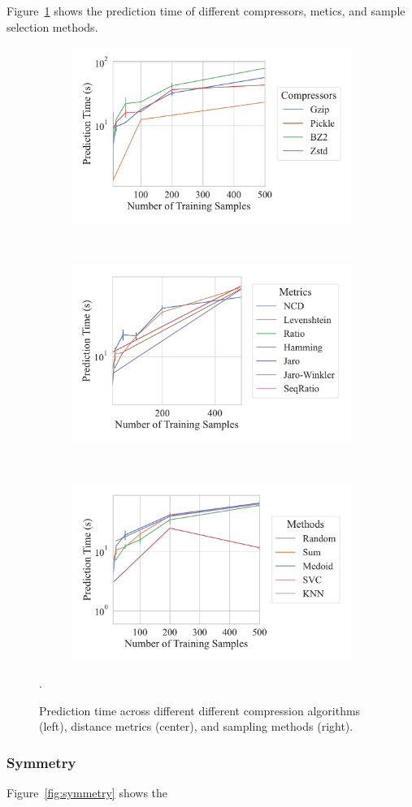 \documentclass[sigconf]{acmart}
\begin{document}
Figure~\ref{fig:prediction_time} shows the prediction time of different compressors, metics, and sample selection methods.
\begin{figure}
	\begin{subfigure}
		\centering
		\includegraphics[width=.32\textwidth]{figs/truthseeker/compressor_vs_predict_time.pdf}
	\end{subfigure}%
	~
	\begin{subfigure}
		\centering
		\includegraphics[width=.32\textwidth]{figs/truthseeker/metric_vs_predict_time.pdf}
	\end{subfigure}
	~
	\begin{subfigure}
		\centering
		\includegraphics[width=.32\textwidth]{figs/truthseeker/method_vs_predict_time.pdf}
	\end{subfigure}
	\caption{Prediction time across different different compression algorithms (left), distance metrics (center), and sampling methods (right).}.
	\label{fig:prediction_time}
 
\end{figure}

\subsubsection{Symmetry}

Figure~\ref{fig:symmetry} shows the 
\end{document}
